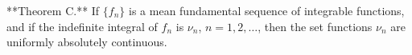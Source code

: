 **Theorem C.** If $\{f_n\}$ is a mean fundamental sequence of integrable functions, and if the indefinite integral of $f_n$ is $\nu_n$, $n=1,2,\dots$, then the set functions $\nu_n$ are uniformly absolutely continuous.
